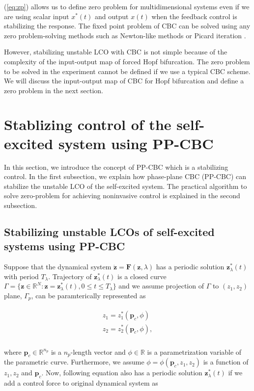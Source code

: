 \documentclass[openacc]{rsproca_new}%
\theoremstyle{own}
\def\vec#1{\ensuremath{\mathbf{#1}}}
\newcommand{\Eref}[1]{(\ref{#1})}
\begin{document}
\noindent \Eref{eq:zp} allows us to define zero problem for multidimensional systems even if we are using scalar input $x^*(t)$ and output $x(t)$ when the feedback control is stabilizing the response. The fixed point problem of CBC can be solved using any zero problem-solving methods such as Newton-like methods \cite{schilder2015experimental} or Picard iteration \cite{barton2013systematic}.

However, stabilizing unstable LCO with CBC is not simple because of the complexity of the input-output map of forced Hopf bifurcation. The zero problem to be solved in the experiment cannot be defined if we use a typical CBC scheme. We will discuss the input-output map of CBC for Hopf bifurcation and define a zero problem in the next section.

\section{Stablizing control of the self-excited system using PP-CBC}\label{SNH}

In this section, we introduce the concept of PP-CBC which is a stabilizing control.
In the first subsection, we explain how phase-plane CBC (PP-CBC) can stabilize the unstable LCO of the self-excited system. The practical algorithm to solve zero-problem for achieving noninvasive control is explained in the second subsection.

\subsection{Stabilizing unstable LCOs of self-excited systems using PP-CBC} \label{CBC-t}
Suppose that the dynamical system $\dot{\vec{z}}= \vec F(\vec{z},\lambda)$ has a periodic solution $\vec z^*_{\lambda}(t)$ with period $T_{\lambda}$. Trajectory of $\vec z^*_{\lambda}(t)$ is a closed curve  $\Gamma=\{ \vec z \in \mathbb{R}^N: \vec z =\vec z^*_{\lambda}(t), 0 \leq t \leq T_{\lambda}\}$
and we assume projection of $\Gamma$ to $(z_1,z_2)$ plane, $\Gamma_p$, can be paramterically represented as

\begin{align}\label{PP_curve}
	\begin{split}
z_1=z^*_1(\vec p_c,\phi)\\
z_2=z^*_2(\vec p_c,\phi),\\
\end{split}
\end{align}

\noindent where $\vec p_c\in \mathbb{R}^{n_p}$ is a $n_p$-length vector and $\phi \in \mathbb{R}$ is a parametrization variable of the parametric curve. Furthermore, we assume $\phi=\phi(\vec p_c,z_1,z_2)$ is a function of $z_1,z_2$ and $\vec p_c$. Now, following equation also has a periodic solution $\vec z^*_{\lambda}(t)$ if we add a control force to original dynamical system as
\end{document}
